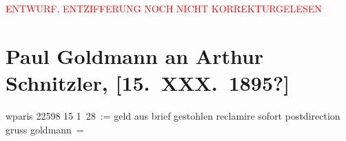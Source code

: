 
\begin{center}
            \textcolor{red}{ENTWURF. ENTZIFFERUNG NOCH NICHT KORREKTURGELESEN}
                      \end{center}
            
               \section[Paul Goldmann an Arthur Schnitzler, {[}15. XXX. 1895?{]}]{ Paul Goldmann an Arthur Schnitzler, {[}15. XXX. 1895?{]}}\nopagebreak{}\rehead{ }\begin{ledgroupsized}[t]{13cm}\normalsize\beginnumbering{} \toendnotes[C]{\smallbreak\pagebreak[2]} 
\pstart
           \centering{}{\pb}wparis 22598 15{ }1 28 :=\pend
           \pstart
           geld aus brief gestohlen reclamire sofort postdirection\pend
           \pstart gruss \spacefill\mbox{goldmann =}\pend{}\endnumbering{}\end{ledgroupsized}\begin{anhang}\end{anhang}\newcommand{\dateiname}{L02694}\newcommand{\titel}{Paul Goldmann an Arthur Schnitzler, [15. XXX. 1895?]}\newcommand{\editorInnen}{Martin Anton Müller und Laura Untner}
      
